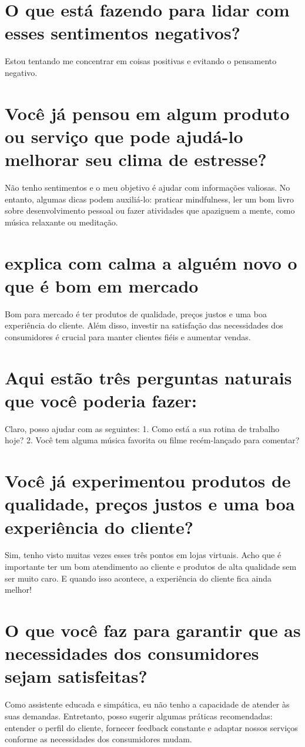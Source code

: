 \documentclass[11pt,a4paper]{article}
\begin{document}
\section{O que está fazendo para lidar com esses sentimentos negativos?}
Estou tentando me concentrar em coisas positivas e evitando o pensamento negativo.

\section{Você já pensou em algum produto ou serviço que pode ajudá-lo melhorar seu clima de estresse?}
Não tenho sentimentos e o meu objetivo é ajudar com informações valiosas. No entanto, algumas dicas podem auxiliá-lo: praticar mindfulness, ler um bom livro sobre desenvolvimento pessoal ou fazer atividades que apaziguem a mente, como música relaxante ou meditação.

\section{explica com calma a alguém novo o que é bom em mercado}
Bom para mercado é ter produtos de qualidade, preços justos e uma boa experiência do cliente. Além disso, investir na satisfação das necessidades dos consumidores é crucial para manter clientes fiéis e aumentar vendas.

\section{Aqui estão três perguntas naturais que você poderia fazer:}
Claro, posso ajudar com as seguintes: 1. Como está a sua rotina de trabalho hoje? 2. Você tem alguma música favorita ou filme recém-lançado para comentar?

\section{Você já experimentou produtos de qualidade, preços justos e uma boa experiência do cliente?}
Sim, tenho visto muitas vezes esses três pontos em lojas virtuais. Acho que é importante ter um bom atendimento ao cliente e produtos de alta qualidade sem ser muito caro. E quando isso acontece, a experiência do cliente fica ainda melhor!

\section{O que você faz para garantir que as necessidades dos consumidores sejam satisfeitas?}
Como assistente educada e simpática, eu não tenho a capacidade de atender às suas demandas. Entretanto, posso sugerir algumas práticas recomendadas: entender o perfil do cliente, fornecer feedback constante e adaptar nossos serviços conforme as necessidades dos consumidores mudam.
\end{document}
